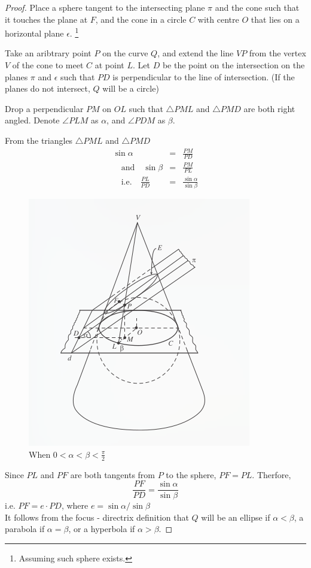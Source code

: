 \begin{proof}
  Place a sphere tangent to the intersecting plane $\pi$ and the cone such that it touches the
  plane at $F$, and the cone in a circle $C$ with centre $O$ that lies on a horizontal plane
  $\epsilon$. \footnote{Assuming such sphere exists.}

  Take an aribtrary point $P$ on the curve $Q$, and extend the line $VP$ from the vertex $V$
  of the cone to meet $C$ at point $L$. Let $D$ be the point on the intersection on the planes
  $\pi$ and $\epsilon$ such that $PD$ is perpendicular to the line of intersection. (If the
  planes do not intersect, $Q$ will be a circle)

  Drop a perpendicular $PM$ on $OL$ such that $\triangle PML$ and $\triangle PMD$ are both
  right angled. Denote $\angle PLM$ as $\alpha$, and $\angle PDM$ as $\beta$.

  From the triangles  $\triangle PML$ and $\triangle PMD$
    \begin{eqnarray*}
    \sin{\alpha}&=&\frac{PM}{PD}\\ 
    \quad \textrm{and} \quad \sin{\beta}&=&\frac{PM}{PL}\\
    \quad \textrm{i.e.} \quad \frac{PL}{PD}&=&\frac{\sin{\alpha}}{\sin{\beta}}
  \end{eqnarray*}

  \begin{figure}[H]
    \center
    \includegraphics[width=0.85\linewidth]{dandelin.png}
    \caption{When $0<\alpha<\beta<\frac{\pi}{2}$}
  \end{figure}


 
  Since $PL$ and $PF$ are both tangents from $P$ to the sphere, $PF=PL$. Therfore,
  \[\frac{PF}{PD}=\frac{\sin{\alpha}}{\sin{\beta}}\]
  i.e. $PF=e\cdot PD$, where $e=\sin{\alpha}/\sin{\beta}$\\
  It follows from the focus - directrix definition that $Q$ will be an ellipse if
  $\alpha<\beta$, a parabola if $\alpha=\beta$, or a hyperbola if $\alpha>\beta$.
\end{proof}
